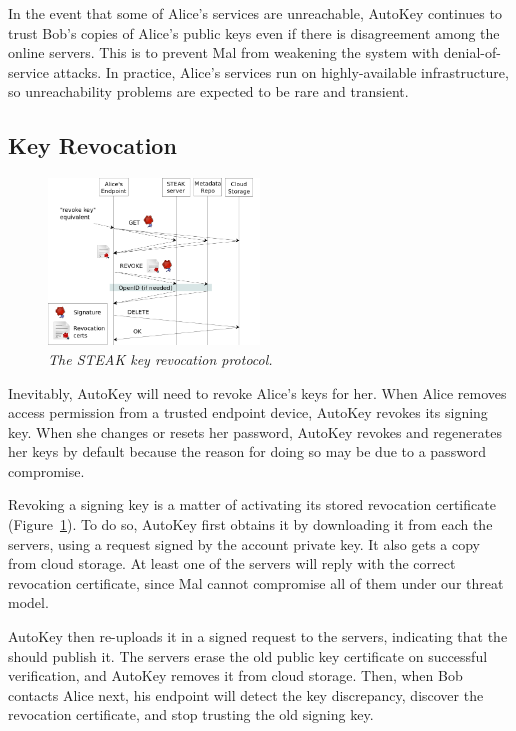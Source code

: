 In the event that some of Alice's services are unreachable, AutoKey continues to trust Bob's copies of Alice's public keys even if there is disagreement among the online servers.  This is to prevent Mal from weakening the system with denial-of-service attacks.  In practice, Alice's services run on highly-available infrastructure, so unreachability problems are expected to be rare and transient.

\subsection{Key Revocation}


\begin{figure}[h!]
\centering
\includegraphics[width=0.5\textwidth]{figures/revoke}
\caption{\it The STEAK key revocation protocol.}
\label{fig:revoke}
\end{figure}

Inevitably, AutoKey will need to revoke Alice's keys for her.  When Alice removes access permission from a trusted endpoint device, AutoKey revokes its signing key.  When she changes or resets her password, AutoKey revokes and regenerates her keys by default because the reason for doing so may be due to a password compromise.

Revoking a signing key is a matter of activating its stored revocation certificate (Figure~\ref{fig:revoke}).  To do so, AutoKey first obtains it by downloading it from each the servers, using a request signed by the account private key.  It also gets a copy from cloud storage.  At least one of the servers will reply with the correct revocation certificate, since Mal cannot compromise all of them under our threat model.

AutoKey then re-uploads it in a signed request to the servers, indicating that the should publish it.  The servers erase the old public key certificate on successful verification, and AutoKey removes it from cloud storage.  Then, when Bob contacts Alice next, his endpoint will detect the key discrepancy, discover the revocation certificate, and stop trusting the old signing key.

